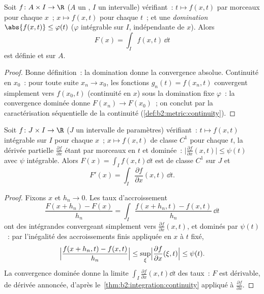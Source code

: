 \begin{theorem}\label{thm:b2:integration:continuity}
Soit $f \colon A \times I \to \R$ ($A$ un , $I$ un
intervalle) vérifiant~: $t \mapsto f(x, t)$  par morceaux pour chaque
$x$~; $x \mapsto f(x, t)$  pour chaque $t$~; et une
\emph{domination} $\abs{f(x,t)} \leq \varphi(t)$ ($\varphi$
intégrable sur $I$, indépendante de $x$). Alors
\[
F(x) = \int_I f(x, t)\,\dd t
\]
est définie et  sur $A$.
\end{theorem}

\begin{proof}
Bonne définition~: la domination donne la convergence absolue. Continuité en
$x_0$~: pour toute suite $x_n \to x_0$, les fonctions $g_n(t) =
f(x_n, t)$ convergent simplement vers $f(x_0, t)$ (continuité en $x$)
sous la domination fixe $\varphi$~: la convergence dominée donne
$F(x_n) \to F(x_0)$~; on conclut par la caractérisation séquentielle de
la continuité (\cref{def:b2:metric:continuity}).
\end{proof}

\begin{theorem}\label{thm:b2:integration:leibnizrule}
Soit $f \colon J \times I \to \R$ ($J$ un intervalle de paramètres)
vérifiant~: $t \mapsto f(x,t)$ intégrable sur $I$ pour chaque $x$~; $x \mapsto
f(x,t)$ de classe $C^1$ pour chaque $t$, la dérivée partielle
$\frac{\partial f}{\partial x}$ étant  par morceaux en $t$
et dominée~: $\bigl|\frac{\partial f}{\partial x}(x,t)\bigr| \leq
\psi(t)$ avec $\psi$ intégrable. Alors $F(x) = \int_I f(x,t)\dd t$
est de classe $C^1$ sur $J$ et
\[
F'(x) = \int_I \frac{\partial f}{\partial x}(x, t)\,\dd t .
\]
\end{theorem}

\begin{proof}
Fixons $x$ et $h_n \to 0$. Les taux d'accroissement
\[
\frac{F(x + h_n) - F(x)}{h_n}
= \int_I \frac{f(x + h_n, t) - f(x, t)}{h_n}\,\dd t
\]
ont des intégrandes convergeant simplement vers $\frac{\partial f}{\partial
x}(x, t)$, et dominés par $\psi(t)$~: par l'inégalité des accroissements
finis appliquée en $x$ à $t$ fixé,
\[
\Bigl|\frac{f(x + h_n, t) - f(x,t)}{h_n}\Bigr|
\leq \sup_{\xi} \Bigl|\frac{\partial f}{\partial x}(\xi, t)\Bigr|
\leq \psi(t) .
\]
La convergence dominée donne la limite $\int_I \frac{\partial
f}{\partial x}(x,t)\dd t$ des taux~: $F$ est dérivable,
de dérivée annoncée,  d'après le~\cref{thm:b2:integration:continuity}
appliqué à $\frac{\partial f}{\partial x}$.
\end{proof}

